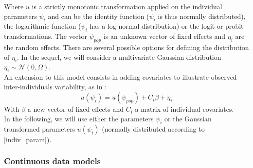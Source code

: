 \documentclass[a4paper]{article}
\theoremstyle{plain}
\theoremstyle{plain}
\theoremstyle{definition}
\begin{document}
Where $u$ is a strictly monotonic transformation applied on the individual parameters $\psi_i$ and can be the identity function ($\psi_i$ is thus normally distributed), the logarithmic function ($\psi_i$ has a log-normal distribution) or the logit or probit transformations. The vector $\psi_{pop}$ is an unknown vector of fixed effects and $\eta_i$ are the random effects. There are several possible options for defining the distribution of $\eta_i$. In the sequel, we will consider a multivariate Gaussian distribution $\eta_i \sim \mathcal{N}(0,\Omega)$.\\

An extension to this model consists in adding covariates to illustrate observed inter-individuals variability, as in \cite{laviellebook}:
\begin{equation}
u(\psi_i) = u(\psi_{pop}) + C_i \beta+ \eta_i
\end{equation}
With $\beta$ a new vector of fixed effects and $C_i$ a matrix of individual covariates.\\
In the following, we will use either the parameters $\psi_i$ or the Gaussian transformed parameters $u(\psi_i)$ (normally distributed according to \eqref{indiv_param}).


\subsubsection{Continuous data models}
\end{document}

